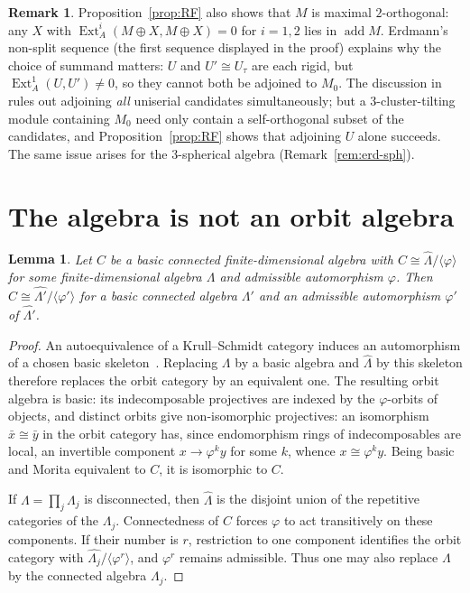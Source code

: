 \documentclass[11pt]{amsart}
\theoremstyle{plain}
\newtheorem{lemma}[theorem]{Lemma}
\theoremstyle{definition}
\newtheorem{remark}[theorem]{Remark}
\DeclareMathOperator{\Ext}{Ext}
\DeclareMathOperator{\add}{add}
\newcommand{\rep}{\widehat{\Lambda}}
\begin{document}
\begin{remark}\label{rem:erd-tri}
Proposition~\ref{prop:RF} also shows that $M$ is maximal $2$-orthogonal: any $X$ with $\Ext^{i}_A(M\oplus
X,M\oplus X)=0$ for $i=1,2$ lies in $\add M$. Erdmann's non-split sequence (the first sequence displayed in
the proof) explains why the choice of summand matters: $U$ and $U'\cong U_\tau$ are each rigid, but
$\Ext^1_A(U,U')\neq 0$, so they cannot both be adjoined to $M_0$. The discussion in~\cite[\S5]{Erdmann} rules
out adjoining \emph{all} uniserial candidates simultaneously; but a $3$-cluster-tilting module containing
$M_0$ need only contain a self-orthogonal subset of the candidates, and Proposition~\ref{prop:RF} shows that
adjoining $U$ alone succeeds. The same issue arises for the $3$-spherical algebra (Remark~\ref{rem:erd-sph}).
\end{remark}

\section{The algebra is not an orbit algebra}\label{sec:nonorbit}

\begin{lemma}\label{lem:reduction}
Let $C$ be a basic connected finite-dimensional algebra with $C\cong\rep/\langle\varphi\rangle$ for some
finite-dimensional algebra $\Lambda$ and admissible automorphism $\varphi$. Then
$C\cong\widehat{\Lambda'}/\langle\varphi'\rangle$ for a basic \emph{connected} algebra $\Lambda'$ and an
admissible automorphism $\varphi'$ of $\widehat{\Lambda'}$.
\end{lemma}

\begin{proof}
An autoequivalence of a Krull--Schmidt category induces an automorphism of a chosen basic
skeleton~\cite[Definition~2.16 and the paragraph following it]{DI}. Replacing $\Lambda$ by a basic algebra and
$\rep$ by this skeleton therefore replaces the orbit category by an equivalent one. The resulting orbit
algebra is basic: its indecomposable projectives are indexed by the $\varphi$-orbits of objects, and distinct
orbits give non-isomorphic projectives: an isomorphism $\bar x\cong\bar y$ in the orbit category has, since
endomorphism rings of indecomposables are local, an invertible component $x\to\varphi^ky$ for some $k$, whence
$x\cong\varphi^ky$. Being basic and Morita equivalent to $C$, it is isomorphic to $C$.

If $\Lambda=\prod_j\Lambda_j$ is disconnected, then $\rep$ is the disjoint union of the repetitive categories
of the $\Lambda_j$. Connectedness of $C$ forces $\varphi$ to act transitively on these components. If their
number is $r$, restriction to one component identifies the orbit category with
$\widehat{\Lambda_j}/\langle\varphi^r\rangle$, and $\varphi^r$ remains admissible. Thus one may also replace
$\Lambda$ by the connected algebra $\Lambda_j$.
\end{proof}
\end{document}

